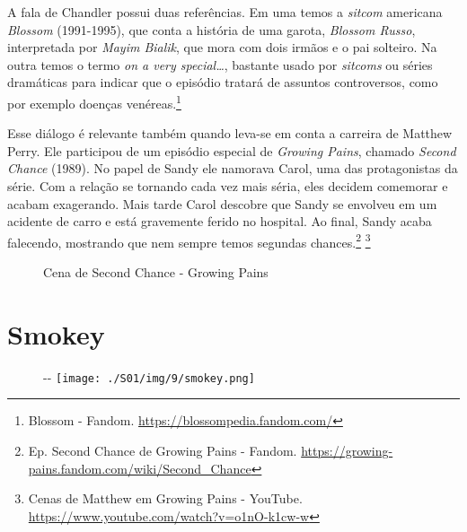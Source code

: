 A fala de Chandler possui duas referências. Em uma temos a \emph{sitcom}
americana \emph{Blossom} (1991-1995), que conta a história de uma
garota, \emph{Blossom Russo}, interpretada por \emph{Mayim Bialik}, que
mora com dois irmãos e o pai solteiro. Na outra temos o termo \emph{on a
very special\ldots{}}, bastante usado por \emph{sitcoms} ou séries
dramáticas para indicar que o episódio tratará de assuntos controversos,
como por exemplo doenças venéreas.\footnote{\sloppy Blossom - Fandom. \url{https://blossompedia.fandom.com/}}

Esse diálogo é relevante também quando leva-se em conta a carreira de
Matthew Perry. Ele participou de um episódio especial de \emph{Growing
Pains}, chamado \emph{Second Chance} (1989). No papel de Sandy ele
namorava Carol, uma das protagonistas da série. Com a relação se
tornando cada vez mais séria, eles decidem comemorar e acabam
exagerando. Mais tarde Carol descobre que Sandy se envolveu em um
acidente de carro e está gravemente ferido no hospital. Ao final, Sandy
acaba falecendo, mostrando que nem sempre temos segundas
chances.\footnote{\sloppy Ep. Second Chance de Growing Pains - Fandom. \url{https://growing-pains.fandom.com/wiki/Second_Chance}}
\footnote{\sloppy Cenas de Matthew em Growing Pains - YouTube. \url{https://www.youtube.com/watch?v=o1nO-k1cw-w}}

\begin{figure}
  \centering
    \caption{Cena de Second Chance - Growing Pains\label{fig:cena-de-second-chance-growing-pains}}
\end{figure}

\hypertarget{smokey}{%
\section{Smokey}\label{smokey}}

\begin{figure}[!ht]
  \begin{adjustwidth}{-\oddsidemargin-1in}{-\rightmargin}
    \centering
    \texttt{[image: ./S01/img/9/smokey.png]}
  \end{adjustwidth}
\end{figure}

